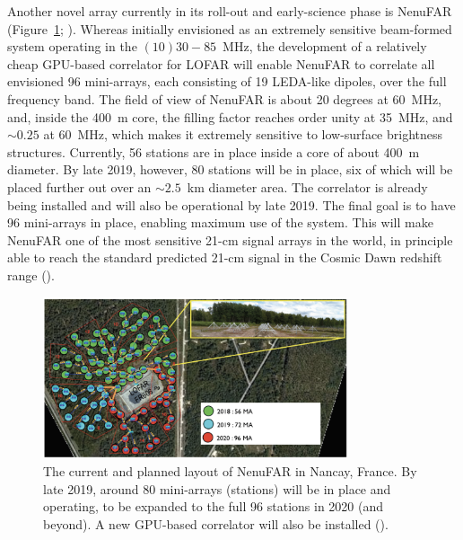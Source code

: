 Another novel array currently in its roll-out and early-science phase is NenuFAR (Figure~\ref{fig:fig_NenuFAR}; \cite{french_ska_white_book}). Whereas initially envisioned as an extremely sensitive beam-formed system operating in  the $(10)30-85$~MHz, the development of a relatively cheap GPU-based correlator for LOFAR will enable NenuFAR to correlate all envisioned 96 mini-arrays, each consisting of 19 LEDA-like dipoles, over the full frequency band. 
The field of view of NenuFAR is about 20 degrees at 60~MHz, and, inside the 400~m core, the filling factor reaches order unity at 35~MHz, and $\sim 0.25$ at 60~MHz, which makes it extremely sensitive to low-surface brightness structures. Currently, 56 stations are in place inside a core of about 400~m diameter.
By late 2019, however, 80 stations will be in place, six of which  will be placed further out over an $\sim 2.5$~km diameter area. The correlator is already being installed and will also be operational by late 2019. The final goal is to have 96 mini-arrays in place, enabling maximum use of the system. This will make NenuFAR one of the most sensitive 21-cm signal arrays in the world, in principle able to reach the standard predicted 21-cm signal in the Cosmic Dawn redshift range (\cite{mesinger16}). 

\begin{figure}[t]
\begin{center}
\includegraphics[width=0.8\textwidth]{Koopmans_Bernardi/NenuFAR.png}
\end{center}
\caption{The current and planned layout of NenuFAR in Nancay, France. By late 2019, around 80 mini-arrays (stations) will be in place and operating, to be expanded to the full 96 stations in 2020 (and beyond). A new GPU-based correlator will also be installed (\cite{french_ska_white_book}).}
\label{fig:fig_NenuFAR}
\end{figure}

